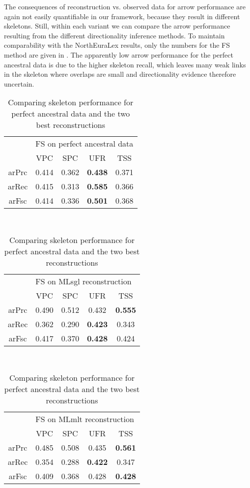 The consequences of reconstruction vs. observed data for arrow performance are again not easily quantifiable in our framework, because they result in different skeletons. Still, within each variant we can compare the arrow performance resulting from the different directionality inference methods. To maintain comparability with the NorthEuraLex results, only the numbers for the FS method are given in . The apparently low arrow performance for the perfect ancestral data is due to the higher skeleton recall, which leaves many weak links in the skeleton where overlaps are small and directionality evidence therefore uncertain.


\begin{table}[t]
 \centering
  \begin{tabular}{ccccc}
    \hline \hline
   & \multicolumn{4}{l}{FS on perfect ancestral data}\\ 
   & VPC & SPC & UFR & TSS\\ \hline
  arPrc & 0.414 & 0.362 & \textbf{0.438} & 0.371\\
  arRec & 0.415 & 0.313 & \textbf{0.585} & 0.366\\
  arFsc & 0.414 & 0.336 & \textbf{0.501} & 0.368\\
  \hline
 \end{tabular}\\[0.5cm]
 \begin{tabular}{ccccc}
  \hline \hline
   & \multicolumn{4}{l}{FS on MLsgl reconstruction}\\ 
   & VPC & SPC & UFR & TSS\\ \hline
  arPrc & 0.490 & 0.512 & 0.432 & \textbf{0.555}\\
  arRec & 0.362 & 0.290 & \textbf{0.423} & 0.343\\
  arFsc & 0.417 & 0.370 & \textbf{0.428} & 0.424\\
  \hline
 \end{tabular}\\[0.5cm]
 \begin{tabular}{ccccc}
  \hline \hline
   & \multicolumn{4}{l}{FS on MLmlt reconstruction}\\ 
   & VPC & SPC & UFR & TSS\\ \hline
  arPrc & 0.485 & 0.508 & 0.435 & \textbf{0.561}\\
  arRec & 0.354 & 0.288 & \textbf{0.422} & 0.347\\
  arFsc & 0.409 & 0.368 & 0.428 & \textbf{0.428}\\
  \hline
 \end{tabular}
 \caption{Comparing skeleton performance for perfect ancestral data and the two best reconstructions}
 \label{perfect-vs-reconstruction-arrows}
\end{table}


